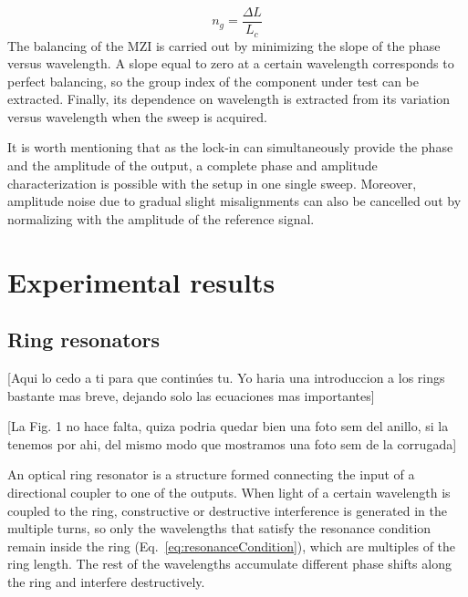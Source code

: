 \documentclass[journal]{IEEEtran}
\begin{document}
\begin{equation}
n_{g} = \frac{\Delta L}{L_{c}}
\label{eq:group_index}
\end{equation}
The balancing of the MZI is carried out by minimizing the slope of the phase versus wavelength. A slope equal to zero at a certain wavelength corresponds to perfect balancing, so the group index of the component under test can be extracted. Finally, its dependence on wavelength is extracted from its variation versus wavelength when the sweep is acquired.

It is worth mentioning that as the lock-in can simultaneously provide the phase and the amplitude of the output, a complete phase and amplitude characterization is possible with the setup in one single sweep. Moreover, amplitude noise due to gradual slight misalignments can also be cancelled out by normalizing with the amplitude of the reference signal.



\section{Experimental results}

\subsection {Ring resonators}

[Aqui lo cedo a ti para que continúes tu. Yo haria una introduccion a los rings bastante mas breve, dejando solo las ecuaciones mas importantes]

[La Fig. 1 no hace falta, quiza podria quedar bien una foto sem del anillo, si la tenemos por ahi, del mismo modo que mostramos una foto sem de la corrugada]



An optical ring resonator is a structure formed connecting the input of a directional coupler to one of the outputs. When light of a certain wavelength is coupled to the ring, constructive or destructive interference is generated in the multiple turns, so only the wavelengths that satisfy the resonance condition remain inside the ring (Eq.~\ref{eq:resonanceCondition}), which are multiples of the ring length. The rest of the wavelengths accumulate different phase shifts along the ring and interfere destructively. 
\end{document}
